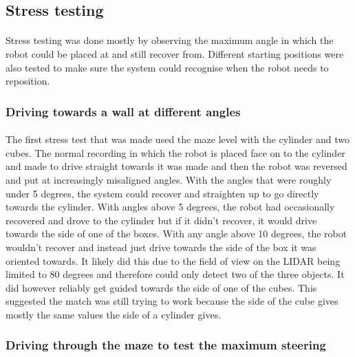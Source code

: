 \subsection{Stress testing}
\paragraph{}
Stress testing was done mostly by observing the maximum angle in which the robot could be placed at and still recover from. Different starting positions were also tested to make sure the system could recognise when the robot needs to reposition.

\subsubsection{Driving towards a wall at different angles}
\paragraph{}
The first stress test that was made used the maze level with the cylinder and two cubes. The normal recording in which the robot is placed face on to the cylinder and made to drive straight towards it was made and then the robot was reversed and put at increasingly misaligned angles. With the angles that were roughly under 5 degrees, the system could recover and straighten up to go directly towards the cylinder. With angles above 5 degrees, the robot had occasionally recovered and drove to the cylinder but if it didn't recover, it would drive towards the side of one of the boxes. With any angle above 10 degrees, the robot wouldn't recover and instead just drive towards the side of the box it was oriented towards. It likely did this due to the field of view on the LIDAR being limited to 80 degrees and therefore could only detect two of the three objects. It did however reliably get guided towards the side of one of the cubes. This suggested the match was still trying to work because the side of the cube gives mostly the same values the side of a cylinder gives.

\subsubsection{Driving through the maze to test the maximum steering}
